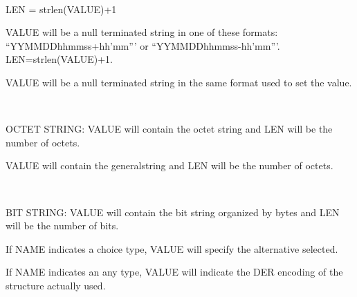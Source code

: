 \documentclass[]{article}
\begin{document}
~

LEN = strlen(VALUE)+1


VALUE will be a null terminated string in one of these formats:
``YYMMDDhhmmss+hh'mm''' or ``YYMMDDhhmmss-hh'mm'''. LEN=strlen(VALUE)+1.


VALUE will be a null terminated string in the same format used to set
the value.

~

OCTET STRING: VALUE will contain the octet string and LEN will be the
number of octets.


VALUE will contain the generalstring and LEN will be the number of
octets.

~

BIT STRING: VALUE will contain the bit string organized by bytes and LEN
will be the number of bits.


If NAME indicates a choice type, VALUE will specify the alternative
selected.


If NAME indicates an any type, VALUE will indicate the DER encoding of
the structure actually used.

\end{document}
